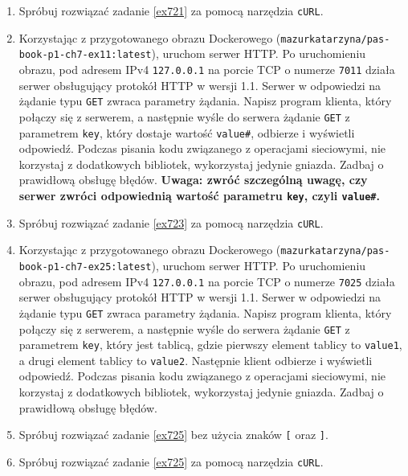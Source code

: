\documentclass{article}
\begin{document}
\begin{enumerate}[label=\textbf{7.\arabic*}]
\item Spróbuj rozwiązać zadanie \ref{ex721} za pomocą narzędzia \texttt{cURL}.  
\item \label{ex723} Korzystając z przygotowanego obrazu Dockerowego (\texttt{mazurkatarzyna/pas-book-p1-ch7-ex11:latest}), uruchom serwer HTTP.  Po uruchomieniu obrazu, pod adresem IPv4 \texttt{127.0.0.1} na porcie TCP o numerze \texttt{7011} działa serwer obsługujący protokół HTTP w wersji 1.1. Serwer w odpowiedzi na żądanie typu \texttt{GET} zwraca parametry żądania. Napisz program klienta, który połączy się z serwerem, a następnie wyśle do serwera żądanie \texttt{GET} z parametrem \texttt{key}, który dostaje wartość \texttt{value\#}, odbierze i wyświetli odpowiedź. Podczas pisania kodu związanego z operacjami sieciowymi, nie korzystaj z dodatkowych bibliotek, wykorzystaj jedynie gniazda. Zadbaj o prawidłową obsługę błędów. \textbf{Uwaga: zwróć szczególną uwagę, czy serwer zwróci odpowiednią wartość parametru \texttt{key}, czyli \texttt{value\#}.} \
\item Spróbuj rozwiązać zadanie \ref{ex723} za pomocą narzędzia \texttt{cURL}.  
\item \label{ex725} Korzystając z przygotowanego obrazu Dockerowego (\texttt{mazurkatarzyna/pas-book-p1-ch7-ex25:latest}), uruchom serwer HTTP.  Po uruchomieniu obrazu, pod adresem IPv4 \texttt{127.0.0.1} na porcie TCP o numerze \texttt{7025} działa serwer obsługujący protokół HTTP w wersji 1.1. Serwer w odpowiedzi na żądanie typu \texttt{GET} zwraca parametry żądania. Napisz program klienta, który połączy się z serwerem, a następnie wyśle do serwera żądanie \texttt{GET} z parametrem \texttt{key}, który jest tablicą, gdzie pierwszy element tablicy to \texttt{value1}, a drugi element tablicy to \texttt{value2}.  Następnie klient odbierze i wyświetli odpowiedź. Podczas pisania kodu związanego z operacjami sieciowymi, nie korzystaj z dodatkowych bibliotek, wykorzystaj jedynie gniazda. Zadbaj o prawidłową obsługę błędów.  
\item Spróbuj rozwiązać zadanie \ref{ex725} bez użycia znaków \texttt{[} oraz \texttt{]}.
\item Spróbuj rozwiązać zadanie \ref{ex725} za pomocą narzędzia \texttt{cURL}.  



\end{enumerate}

\newpage 

\end{document}
